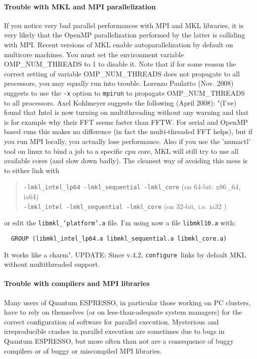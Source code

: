 \documentclass[12pt,a4paper]{article}
\def\qe{{\sc Quantum ESPRESSO}}
\def\configure{\texttt{configure}}
\begin{document}
\paragraph{Trouble with MKL and MPI parallelization}
If you notice very bad parallel performances with MPI and MKL libraries,
it is very likely that the OpenMP parallelization performed by the latter
is colliding with MPI. Recent versions of MKL enable autoparallelization
by default on multicore machines.  You must set the environment variable
OMP\_NUM\_THREADS to 1 to disable it.
Note that if for some reason the correct setting  of variable
OMP\_NUM\_THREADS
does not propagate to all processors, you may equally run into trouble.
Lorenzo Paulatto (Nov. 2008) suggests to use the \texttt{-x} option to \texttt{mpirun} to
propagate OMP\_NUM\_THREADS to all processors.
Axel Kohlmeyer suggests the following (April 2008):
"(I've) found that Intel is now turning on multithreading without any
warning and that is for example why their FFT seems faster than
FFTW. For serial and OpenMP based runs this makes no difference (in
fact the multi-threaded FFT helps), but if you run MPI locally, you
actually lose performance. Also if you use the 'numactl' tool on linux
to bind a job to a specific cpu core, MKL will still try to use all
available cores (and slow down badly). The cleanest way of avoiding
this mess is to either link with
\begin{quote}
\texttt{-lmkl\_intel\_lp64 -lmkl\_sequential -lmkl\_core} (on 64-bit:
x86\_64, ia64)\\
\texttt{-lmkl\_intel -lmkl\_sequential -lmkl\_core} (on 32-bit, i.e. ia32 )
\end{quote}
or edit the \texttt{libmkl\_'platform'.a} file. I'm using now a file
\texttt{libmkl10.a} with:
\begin{verbatim}
  GROUP (libmkl_intel_lp64.a libmkl_sequential.a libmkl_core.a)
\end{verbatim}
It works like a charm". UPDATE: Since v.4.2, \configure\ links by
default MKL without multithreaded support.

\paragraph{Trouble with compilers and MPI libraries}
Many users of \qe, in particular those working on PC clusters,
have to rely on themselves (or on less-than-adequate system managers) for
the correct configuration of software for parallel execution. Mysterious and
irreproducible crashes in parallel execution are sometimes due to bugs
in \qe, but more often than not are a consequence of buggy
compilers or of buggy or miscompiled MPI libraries.
\end{document}
